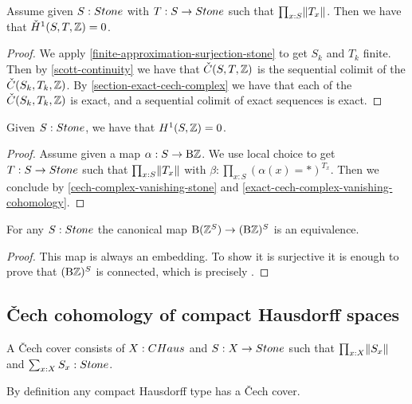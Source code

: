 \begin{lemma}\label{cech-complex-vanishing-stone}
Assume given $S:\Stone$ with $T:S\to\Stone$ such that $\prod_{x:S}\lVert T_x \rVert$. Then we have that $\check{H}^1(S,T,\mathbb{Z}) = 0$.
\end{lemma}


\begin{proof}
We apply \cref{finite-approximation-surjection-stone} to get $S_k$ and $T_k$ finite. Then by \cref{scott-continuity} we have that $\check{C}(S,T,\mathbb{Z})$ is the sequential colimit of the $\check{C}(S_k,T_k,\mathbb{Z})$. By \cref{section-exact-cech-complex} we have that each of the $\check{C}(S_k,T_k,\mathbb{Z})$ is exact, and a sequential colimit of exact sequences is exact.
\end{proof}

\begin{lemma}\label{eilenberg-stone-vanish}
Given $S:\Stone$, we have that $H^1(S,\mathbb{Z}) = 0$. 
\end{lemma}

\begin{proof}
Assume given a map $\alpha:S\to \mathrm{B}\mathbb{Z}$. We use local choice to get $T:S\to\Stone$ such that $\prod_{x:S}\lVert T_x \rVert$ with $\beta:\prod_{x:S}(\alpha(x)=*)^{T_x}$. Then we conclude by \cref{cech-complex-vanishing-stone} and \cref{exact-cech-complex-vanishing-cohomology}.
\end{proof}

\begin{corollary}\label{stone-commute-delooping}
For any $S:\Stone$ the canonical map $\mathrm{B}(\mathbb{Z}^S) \to (\mathrm{B}\mathbb{Z})^S$ is an equivalence.
\end{corollary}

\begin{proof}
This map is always an embedding. To show it is surjective it is enough to prove that $(\mathrm{B}\mathbb{Z})^S$ is connected, which is precisely .
\end{proof}


\subsection{\v{C}ech cohomology of compact Hausdorff spaces}

\begin{definition}
A \v{C}ech cover consists of $X:\CHaus$ and $S:X\to\Stone$ such that $\prod_{x:X}\lVert S_x \rVert$ and $\sum_{x:X}S_x:\Stone$.
\end{definition}

By definition any compact Hausdorff type has a \v{C}ech cover.

